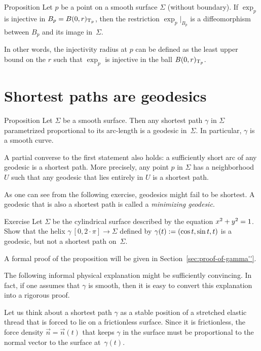 \begin{thm}{Proposition}\label{prop:inj-rad}
Let $p$ be a point on a smooth surface $\Sigma$ (without boundary).
If $\exp_p$ is injective in $B_p=B(0,r)_{\mathrm{T}_p}$, then the restriction $\exp_p|_{B_p}$ is a diffeomorphism between $B_p$ and its image in~$\Sigma$.

In other words, the injectivity radius at $p$ can be defined as the least upper bound on the $r$ such that $\exp_p$ is injective in the ball $B(0,r)_{\mathrm{T}_p}$.
\end{thm}

\section{Shortest paths are geodesics}

\begin{thm}{Proposition}\label{prop:gamma''}
Let $\Sigma$ be a smooth surface.
Then any shortest path $\gamma$ in $\Sigma$ parametrized proportional to its arc-length is a geodesic in~$\Sigma$.
In particular, $\gamma$ is a smooth curve.

A partial converse to the first statement also holds: a sufficiently short arc of any geodesic is a shortest path.
More precisely, any point $p$ in $\Sigma$ has a neighborhood $U$ such that any geodesic that lies entirely in $U$ is a shortest path.
\end{thm}

As one can see from the following exercise, geodesics might fail to be shortest.
A geodesic that is also a shortest path is called a \emph{minimizing geodesic}.

\begin{thm}{Exercise}\label{ex:helix=geodesic}
Let $\Sigma$ be the cylindrical surface described by the equation $x^2\z+y^2=1$.
Show that the helix $\gamma\:[0,2\cdot\pi]\to \Sigma$ defined by $\gamma(t)\z\df(\cos t,\sin t, t)$
is a geodesic, but not a shortest path on~$\Sigma$.
\end{thm}

A formal proof of the proposition will be given in Section~\ref{sec:proof-of-gamma''}.

The following informal physical explanation might be sufficiently convincing.
In fact, if one assumes that $\gamma$ is smooth, then it is easy to convert this explanation into a rigorous proof.

Let us think about a shortest path $\gamma$ as a stable position of a stretched elastic thread that is forced to lie on a frictionless surface.
Since it is frictionless, the force density $\vec n=\vec n(t)$ that keeps $\gamma$ in the surface must be proportional to the normal vector to the surface at~$\gamma(t)$.

